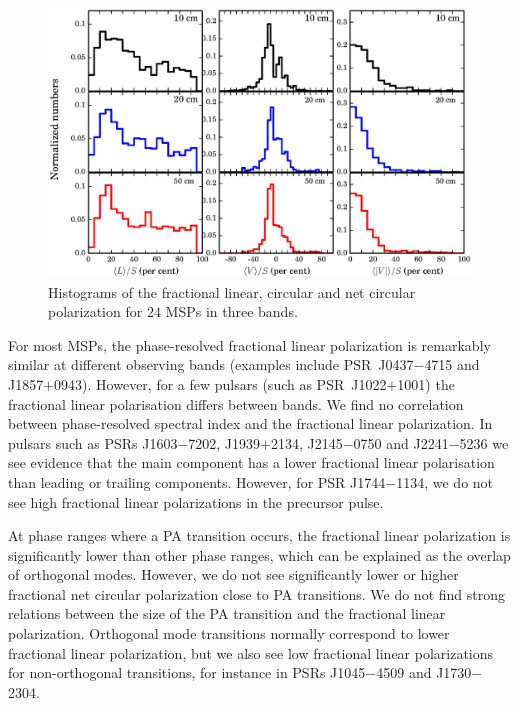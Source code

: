 \documentclass[useAMS,usenatbib]{mn2e}
\begin{document}
\begin{figure}
\begin{center}
\includegraphics[width=5.5 in]{polHist.ps}
\caption{Histograms of the fractional linear, circular and net circular polarization 
for $24$ MSPs in three bands.}
\label{polHist}
\end{center}
\end{figure}

For most MSPs, the phase-resolved fractional linear polarization is remarkably 
similar at different observing bands (examples include PSR~J0437$-$4715 and J1857$+$0943). 
However, for a few pulsars (such as PSR~J1022$+$1001) the fractional linear polarisation 
differs between bands. We find no correlation between phase-resolved spectral index 
and the fractional linear polarization. 
%
In pulsars such as PSRs J1603$-$7202, J1939$+$2134, J2145$-$0750 and J2241$-$5236 
we see evidence that the main component has a lower fractional linear polarisation 
than leading or trailing components. However, for PSR J1744$-$1134, we do not see high 
fractional linear polarizations in the precursor pulse.
%

At phase ranges where a PA transition occurs, the fractional linear 
polarization is significantly lower than other phase ranges, which can be explained as 
the overlap of orthogonal modes. However, we do not see significantly lower or higher 
fractional net circular polarization close to PA transitions.
%
We do not find strong relations between the size of the PA transition and 
the fractional linear polarization. Orthogonal mode transitions normally correspond 
to lower fractional linear polarization, but we also see low fractional linear 
polarizations for non-orthogonal transitions, for instance in PSRs J1045$-$4509 
and J1730$-$2304. 
%
\end{document}
